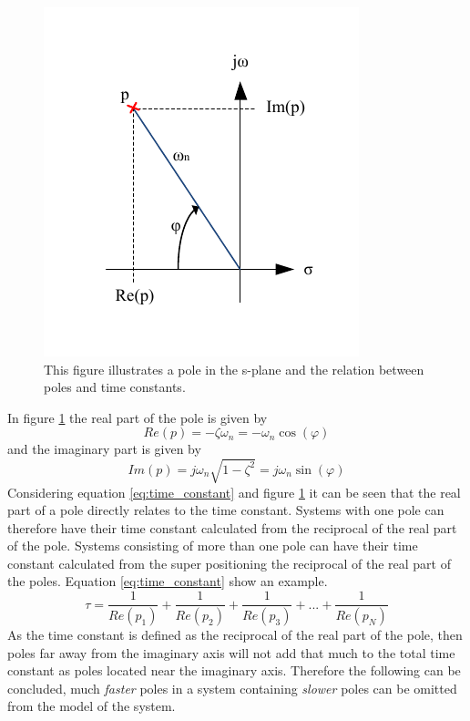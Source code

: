 \begin{figure}[htb]
	\begin{center}
	\includegraphics[scale=1,trim=0 0 0 0]{graphics/splane.pdf} %
	\caption{This figure illustrates a pole in the s-plane and the relation between poles and time constants.}
	\label{fig:s_plane}			%
	\end{center}
\end{figure}
In figure \ref{fig:s_plane} the real part of the pole is given by 
\begin{equation}
	Re(p) = - \zeta\omega_{n} = - \omega_{n} \cos(\varphi)
\end{equation}
and the imaginary part is given by
\begin{equation}
	Im(p) = j\omega_{n}\sqrt{1 - \zeta^{2}} = j\omega_{n}\sin(\varphi)
\end{equation}
Considering equation \ref{eq:time_constant} and figure \ref{fig:s_plane} it can be seen that the real part of a pole directly relates to the time constant. Systems with one pole can therefore have their time constant calculated from the reciprocal of the real part of the pole. Systems consisting of more than one pole can have their time constant calculated from the super positioning the reciprocal of the real part of the poles. Equation \ref{eq:time_constant} show an example.
\begin{equation}
	\tau = \frac{1}{Re(p_{1})} + \frac{1}{Re(p_{2})} + \frac{1}{Re(p_{3})} + ... + \frac{1}{Re(p_{N})}\label{eq:time_constant}
\end{equation}
As the time constant is defined as the reciprocal of the real part of the pole, then poles far away from the imaginary axis will not add that much to the total time constant as poles located near the imaginary axis. Therefore the following can be concluded, much \textit{faster} poles in a system containing \textit{slower} poles can be omitted from the model of the system.

